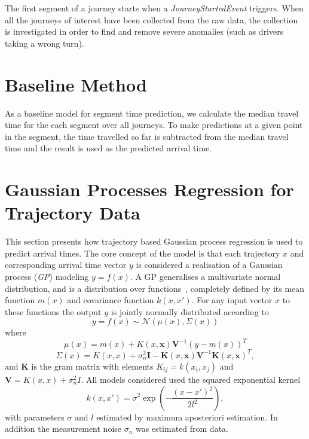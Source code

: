 The first segment of a journey starts when a \textit{JourneyStartedEvent} triggers. When all the journeys of interest have been collected from the raw data, the collection is investigated in order to find and remove severe anomalies (such as drivers taking a wrong turn). 

\section{Baseline Method}
As a baseline model for segment time prediction, we calculate the median travel time for the each segment over all journeys. To make predictions at a given point in the segment, the time travelled so far is subtracted from the median travel time and the result is used as the predicted arrival time.

\section{Gaussian Processes Regression for Trajectory Data}
This section presents how trajectory based Gaussian process regression
is used to predict arrival times. The core concept of the model is that each
trajectory $x$ and corresponding arrival time vector $y$ is
considered a realisation of a Gaussian process (\textit{GP}) modeling $y =
f(x)$. A GP generalises a multivariate
normal distribution, and is a distribution over
functions~\cite{Rasmussen-Williams-2006}, completely defined by its
mean function $m(x)$ and covariance function $k(x, x')$. For any input
vector $x$ to these functions the output $y$ is jointly normally distributed according to
\begin{equation}
  \label{eq:gp}
  y = f(x) \sim \mathcal{N}(\mu(x), \Sigma(x))
\end{equation}
where
\begin{equation}
  \label{eq:gp-mean-function}
  \mu(x) = m(x) + K(x, \textbf{x})\textbf{V}^{-1}{(y-m(x))}^{T}
\end{equation}
\begin{equation}
  \label{eq:gp-covariance-function}
  \Sigma(x) = K(x, x) + \sigma^{2}_n\textbf{I} - \textbf{K}(x, \textbf{x})\textbf{V}^{-1}{\textbf{K}(x, \textbf{x})}^{T},
\end{equation}
and $\textbf{K}$ is the gram matrix with elements $K_{ij} = k(x_i, x_j)$ and $\textbf{V}
= K(x, x) + \sigma_n^2I$. All models considered used the squared
exponential kernel
\begin{equation}
  k(x, x') = \sigma^2\exp(-\frac{(x-x')^{2}}{2l^2}),
\end{equation}
with parameters $\sigma$ and $l$ estimated by maximum aposteriori
estimation. In addition the measurement noise $\sigma_n$ was estimated
from data.

